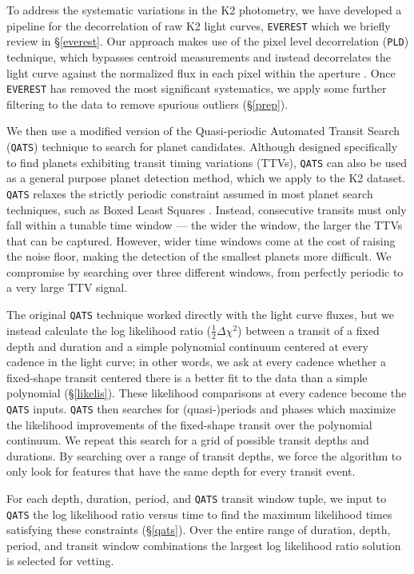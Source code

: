 \documentclass[twocolumn]{aastex62}
\newcommand{\pipeline}[1]{\texttt{#1}}
\begin{document}
To address the systematic variations in the K2 photometry, we have
developed a pipeline for the decorrelation of raw K2 light curves,
\pipeline{EVEREST} \citep{lug16,lug18} which we briefly review in
\S\ref{everest}.  Our approach makes use of the pixel level
decorrelation (\pipeline{PLD}) technique, which bypasses centroid
measurements and instead decorrelates the light curve against the
normalized flux in each pixel within the aperture \citep{dem15}. Once
\pipeline{EVEREST} has removed the most significant systematics, we
apply some further filtering to the data to remove spurious outliers
(\S\ref{prep}).

We then use a modified version of the \cite{car13} Quasi-periodic
Automated Transit Search (\pipeline{QATS}) technique to search for
planet candidates. Although designed specifically to find planets
exhibiting transit timing variations (TTVs), \pipeline{QATS} can also
be used as a general purpose planet detection method, which we apply
to the K2 dataset. \pipeline{QATS} relaxes the strictly periodic
constraint assumed in most planet search techniques, such as Boxed
Least Squares \citep[\pipeline{BLS};][]{kov02}. Instead, consecutive
transits must only fall within a tunable time window --- the wider the
window, the larger the TTVs that can be captured.  However, wider time
windows come at the cost of raising the noise floor, making the
detection of the smallest planets more difficult. We compromise by
searching over three different windows, from perfectly periodic to a
very large TTV signal.

The original \pipeline{QATS} technique worked directly with the light
curve fluxes, but we instead calculate the log likelihood ratio
($\frac{1}{2}\Delta \chi^2$) between a transit of a fixed depth and
duration and a simple polynomial continuum centered at every cadence
in the light curve; in other words, we ask at every cadence whether a
fixed-shape transit centered there is a better fit to the data than a
simple polynomial (\S\ref{likelis}). These likelihood comparisons at
every cadence become the \pipeline{QATS} inputs. \pipeline{QATS} then
searches for (quasi-)periods and phases which maximize the likelihood
improvements of the fixed-shape transit over the polynomial
continuum. We repeat this search for a grid of possible transit depths
and durations. By searching over a range of transit depths, we force
the algorithm to only look for features that have the same depth for
every transit event.

For each depth, duration, period, and \pipeline{QATS} transit window
tuple, we input to \pipeline{QATS} the log likelihood ratio versus
time to find the maximum likelihood times satisfying these constraints
(\S\ref{qats}).  Over the entire range of duration, depth, period, and
transit window combinations the largest log likelihood ratio solution
is selected for vetting.
\end{document}

